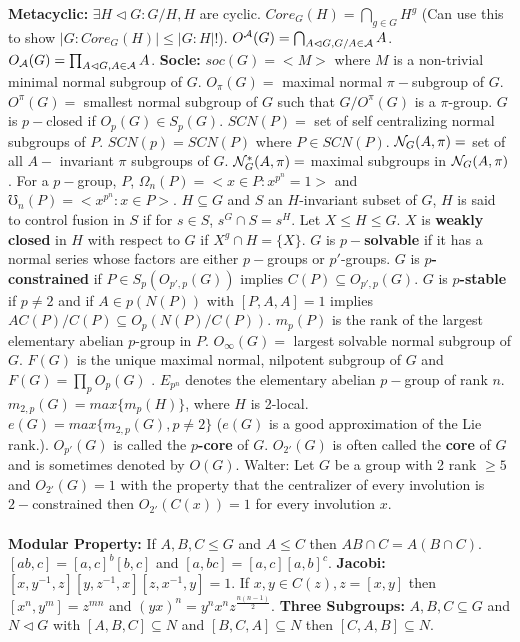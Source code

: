{\bf Metacyclic:} $\exists H \lhd G: G/H ,H$ are cyclic.
$Core_G(H)= \bigcap_{g \in G} H^g$ (Can use this to show $|G:Core_G(H)|\le |G:H|!$).
$O^{\cal A}(G)= \bigcap_{A \lhd G, G/A \in {\cal A}} A$.
$O_{\cal A}(G)= \prod_{A \lhd G, A \in {\cal A}} A$.
{\bf Socle:} $soc(G)= <M>$ where $M$ is a non-trivial minimal normal subgroup of $G$.
$O_{\pi}(G)=$ maximal normal $\pi-$subgroup of $G$.
$O^{\pi}(G)=$ smallest normal subgroup of $G$ such that $G/O^{\pi}(G)$ is a $\pi$-group.
$G$ is $p-$closed if $O_p(G) \in S_p(G)$.
$SCN(P)=$ set of self centralizing normal subgroups of $P$.
$SCN(p)= SCN(P)$ where $P \in SCN(P)$.
${\cal N}_G(A, \pi)=$ set of all $A-$ invariant $\pi$ subgroups of $G$.
${\cal N}_G^*(A, \pi)=$  maximal subgroups in ${\cal N}_G(A, \pi)$.  For a $p-$group, $P$,
$\Omega_n(P)= <x \in P: x^{p^n}=1>$ and
$\mho_n(P)= <x^{p^n}: x \in P>$.
$H \subseteq G$ and $S$ an $H$-invariant subset of $G$, $H$ is said to control fusion
in $S$ if for $s \in S$, $s^G \cap S = s^H$.
Let $X \le H \le G$.  $X$ is {\bf weakly closed} in $H$ with respect to $G$ if
$X^g \cap H = \{X\}$.
$G$ is {\bf $p-$solvable} if it has a normal series whose factors are either
$p-$groups or $p'$-groups.  
$G$ is {\bf $p$-constrained} if 
$P \in S_p ( O_{p',p} (G))$ implies $C(P) \subseteq O_{p',p} (G)$.
$G$ is {\bf $p$-stable} if $p \ne 2$ and 
if $A \in p(N(P))$ with $[P,A,A]= 1$ implies $A C(P)/C(P) \subseteq O_p (N(P)/C(P))$.
$m_p(P)$ is the rank of the largest elementary abelian $p$-group in $P$.
$O_{\infty}(G)=$ largest solvable normal subgroup of $G$.
$F(G)$ is the unique maximal normal, nilpotent subgroup of $G$ and
$F(G)= \prod_p O_p(G)$ .
$E_{p^n}$ denotes the elementary abelian $p-$group of rank $n$.
$m_{2,p}(G) = max \{ m_p (H) \}$, where $H$ is 2-local.
$e(G) = max \{ m_{2,p} (G), p \ne 2 \}$ ($e(G)$ is a good approximation of
the Lie rank.).
$O_{p'}(G)$ is called the {\bf $p$-core} of $G$. $O_{2'}(G)$ is often called the
{\bf core} of $G$ and is sometimes denoted by $O(G)$.
Walter: Let $G$ be a group with 2 rank $\ge 5$ and $O_{2'}(G)=1$ with the property
that the centralizer of every involution is $2-$constrained then $O_{2'}(C(x))=1$ for
every involution $x$.\\
\\
{\bf Modular Property:} If $A, B, C \le G$ and $A \le C$ then $AB \cap C= A(B \cap C)$.
$[ab,c]= [a,c]^b [b,c]$ and $[a,bc]=[a,c] [a,b]^c$.  
{\bf Jacobi:} $ [x, y^{-1}, z] [y, z^{-1}, x] [z, x^{-1}, y]=1$.
If $x,y \in C(z), z=[x,y]$ then
$[x^n , y^m ]= z^{mn}$ and $(yx)^n= y^n x^n z^{\frac {n(n-1)} 2}$.  
{\bf Three Subgroups:} $A, B, C \subseteq G$ and
$N \lhd G$ with
$[A,B,C] \subseteq N$ and
$[B,C,A] \subseteq N$ then
$[C,A,B] \subseteq N$.\\
\\

